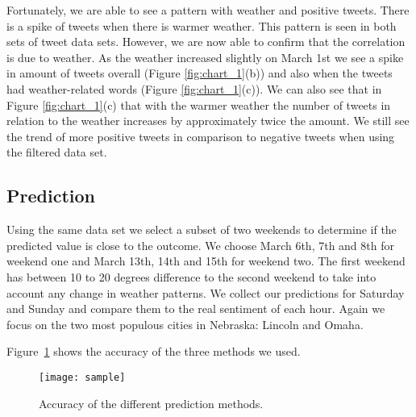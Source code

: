 Fortunately, we are able to see a pattern with weather and positive tweets. There is a spike of tweets when there is warmer weather. This pattern is seen in both sets of tweet data sets. However, we are now able to confirm that the correlation is due to weather. As the weather increased slightly on March 1st we see a spike in amount of tweets overall (Figure \ref{fig:chart_1}(b)) and also when the tweets had weather-related words (Figure \ref{fig:chart_1}(c)). We can also see that in Figure \ref{fig:chart_1}(c) that with the warmer weather the number of tweets in relation to the weather increases by approximately twice the amount. We still see the trend of more positive tweets in comparison to negative tweets when using the filtered data set.


\subsection{Prediction}

Using the same data set we select a subset of two weekends to determine if the predicted value is close to the outcome. We choose March 6th, 7th and 8th for weekend one and March 13th, 14th and 15th for weekend two. The first weekend has between 10 to 20 degrees difference to the second weekend to take into account any change in weather patterns. We collect our predictions for Saturday and Sunday and compare them to the real sentiment of each hour. Again we focus on the two most populous cities in Nebraska: Lincoln and Omaha.

Figure~\ref{fig:predict} shows the accuracy of the three methods we used.

\begin{figure}[t]
\begin{center}
\texttt{[image: sample]}
\end{center}
\vspace{-.1in}
\caption{Accuracy of the different prediction methods.}
\label{fig:predict}
\end{figure}
